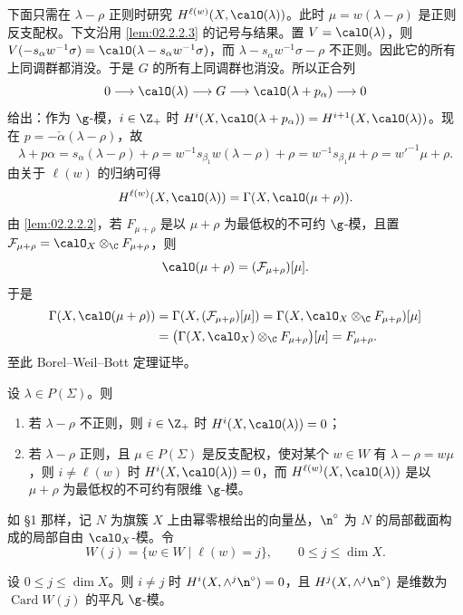 下面只需在 $\lambda-\rho$ 正则时研究 $H^{\ell(w)}(X,\calO(\lambda))$。此时 $\mu=w(\lambda-\rho)$ 是正则反支配权。下文沿用 \ref{lem:02.2.2.3} 的记号与结果。置 $V=\calO(\lambda)$，则 $V(-s_\alpha w^{-1}\sigma)=\calO(\lambda-s_\alpha w^{-1}\sigma)$，而 $\lambda-s_\alpha w^{-1}\sigma-\rho$ 不正则。因此它的所有上同调群都消没。于是 $G$ 的所有上同调群也消没。所以正合列
\[
0\longrightarrow\calO(\lambda)\longrightarrow G\longrightarrow\calO(\lambda+p_\alpha)\longrightarrow 0
\]
给出：作为 $\g$-模，$i\in\Z_+$ 时 $H^i(X,\calO(\lambda+p_\alpha))=H^{i+1}(X,\calO(\lambda))$。现在 $p=-\check\alpha(\lambda-\rho)$，故
\[
\lambda+p\alpha=s_\alpha(\lambda-\rho)+\rho=w^{-1}s_{\beta_1}w(\lambda-\rho)+\rho=w^{-1}s_{\beta_1}\mu+\rho=w'^{-1}\mu+\rho .
\]
由关于 $\ell(w)$ 的归纳可得
\[
H^{\ell(w)}(X,\calO(\lambda))=\Gamma(X,\calO(\mu+\rho)).
\]
由 \ref{lem:02.2.2.2}，若 $F_{\mu+\rho}$ 是以 $\mu+\rho$ 为最低权的不可约 $\g$-模，且置 $\mathcal{F}_{\mu+\rho}=\calO_X\otimes_\C F_{\mu+\rho}$，则
\[
\calO(\mu+\rho)=(\mathcal{F}_{\mu+\rho})[\mu].
\]
于是
\begin{align*}
\Gamma(X,\calO(\mu+\rho))&=\Gamma(X,(\mathcal{F}_{\mu+\rho})[\mu])
=\Gamma(X,\calO_X\otimes_\C F_{\mu+\rho})[\mu]\\
&=\bigl(\Gamma(X,\calO_X)\otimes_\C F_{\mu+\rho}\bigr)[\mu]=F_{\mu+\rho}.
\end{align*}
至此 Borel--Weil--Bott 定理证毕。

\begin{theorem}\label{thm:02.2.5.1}
设 $\lambda\in P(\Sigma)$。则
\begin{enumerate}[label=(\roman*)]
  \item 若 $\lambda-\rho$ 不正则，则 $i\in\Z_+$ 时 $H^i(X,\calO(\lambda))=0$；
  \item 若 $\lambda-\rho$ 正则，且 $\mu\in P(\Sigma)$ 是反支配权，使对某个 $w\in W$ 有 $\lambda-\rho=w\mu$，则 $i\neq\ell(w)$ 时 $H^i(X,\calO(\lambda))=0$，而 $H^{\ell(w)}(X,\calO(\lambda))$ 是以 $\mu+\rho$ 为最低权的不可约有限维 $\g$-模。
\end{enumerate}
\end{theorem}

如 §1 那样，记 $N$ 为旗簇 $X$ 上由幂零根给出的向量丛，$\n^\circ$ 为 $N$ 的局部截面构成的局部自由 $\calO_X$-模。令
\[
W(j)=\{w\in W\mid\ell(w)=j\},\qquad 0\le j\le\dim X.
\]

\begin{lemma}\label{lem:02.2.5.2}
设 $0\le j\le\dim X$。则 $i\neq j$ 时 $H^i(X,\wedge^j\n^\circ)=0$，且 $H^j(X,\wedge^j\n^\circ)$ 是维数为 $\operatorname{Card}W(j)$ 的平凡 $\g$-模。
\end{lemma}

